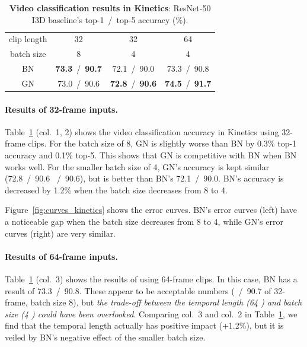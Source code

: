 \documentclass[10pt,twocolumn,letterpaper]{article}
\begin{document}
\renewcommand\arraystretch{1.05}
\setlength{\tabcolsep}{8pt}
\begin{table}[t]
\centering
\small
\begin{tabular}{c|c|c|c}
\hline
clip length & 32 & 32 & 64 \\
batch size & 8 & 4 & 4 \\
\shline
BN & \textbf{73.3}~/~\textbf{90.7} & 72.1~/~90.0 & 73.3~/~90.8 \\
GN & 73.0~/~90.6 & \textbf{72.8}~/~\textbf{90.6} & \textbf{74.5}~/~\textbf{91.7} \\
\hline
\end{tabular}
\vspace{1em}
\caption{\textbf{Video classification results in Kinetics}: ResNet-50 I3D baseline's top-1~/~top-5 accuracy (\%).}
\label{tab:kinetics_bn_gn}
\vspace{-1em}
\end{table}

\paragraph{Results of 32-frame inputs.} Table~\ref{tab:kinetics_bn_gn} (col.~1, 2) shows the video classification accuracy in Kinetics using 32-frame clips. For the batch size of 8, GN is slightly worse than BN by 0.3\% top-1 accuracy and 0.1\% top-5. This shows that GN is competitive with BN when BN works well. For the smaller batch size of 4, GN's accuracy is kept similar (72.8~/~90.6 ~/~90.6), but is better than BN's 72.1~/~90.0. BN's accuracy is decreased by 1.2\% when the batch size decreases from 8 to 4.

Figure~\ref{fig:curves_kinetics} shows the error curves. BN's error curves (left) have a noticeable gap when the batch size decreases from 8 to 4, while GN's error curves (right) are very similar.

\paragraph{Results of 64-frame inputs.} Table~\ref{tab:kinetics_bn_gn} (col.~3) shows the results of using 64-frame clips. In this case, BN has a result of 73.3~/~90.8. These appear to be acceptable numbers (~/~90.7 of 32-frame, batch size 8), but \emph{the trade-off between the temporal length (64 ) and batch size (4 ) could have been overlooked}. Comparing col.~3 and col.~2 in Table~\ref{tab:kinetics_bn_gn}, we find that the temporal length actually has positive impact (+1.2\%), but it is veiled by BN's negative effect of the smaller batch size.
\end{document}

